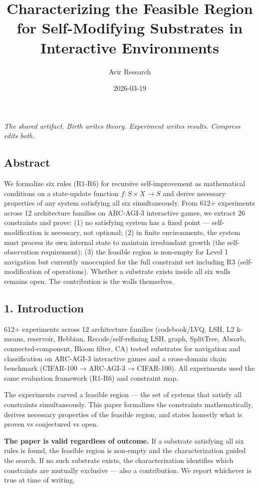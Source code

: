 \documentclass[
  11pt,
]{article}
\title{Characterizing the Feasible Region for Self-Modifying Substrates
in Interactive Environments}
\author{Avir Research}
\date{2026-03-19}
\begin{document}
\maketitle

\emph{The shared artifact. Birth writes theory. Experiment writes
results. Compress edits both.}

\subsection{Abstract}\label{abstract}

We formalize six rules (R1-R6) for recursive self-improvement as
mathematical conditions on a state-update function
\(f: S \times X \to S\) and derive necessary properties of any system
satisfying all six simultaneously. From 612+ experiments across 12
architecture families on ARC-AGI-3 interactive games, we extract 26
constraints and prove: (1) no satisfying system has a fixed point ---
self-modification is necessary, not optional; (2) in finite
environments, the system must process its own internal state to maintain
irredundant growth (the self-observation requirement); (3) the feasible
region is non-empty for Level 1 navigation but currently unoccupied for
the full constraint set including R3 (self-modification of operations).
Whether a substrate exists inside all six walls remains open. The
contribution is the walls themselves.

\subsection{1. Introduction}\label{introduction}

612+ experiments across 12 architecture families (codebook/LVQ, LSH, L2
k-means, reservoir, Hebbian, Recode/self-refining LSH, graph, SplitTree,
Absorb, connected-component, Bloom filter, CA) tested substrates for
navigation and classification on ARC-AGI-3 interactive games and a
cross-domain chain benchmark (CIFAR-100 → ARC-AGI-3 → CIFAR-100). All
experiments used the same evaluation framework (R1-R6) and constraint
map.

The experiments carved a feasible region --- the set of systems that
satisfy all constraints simultaneously. This paper formalizes the
constraints mathematically, derives necessary properties of the feasible
region, and states honestly what is proven vs conjectured vs open.

\textbf{The paper is valid regardless of outcome.} If a substrate
satisfying all six rules is found, the feasible region is non-empty and
the characterization guided the search. If no such substrate exists, the
characterization identifies which constraints are mutually exclusive ---
also a contribution. We report whichever is true at time of writing.
\end{document}
